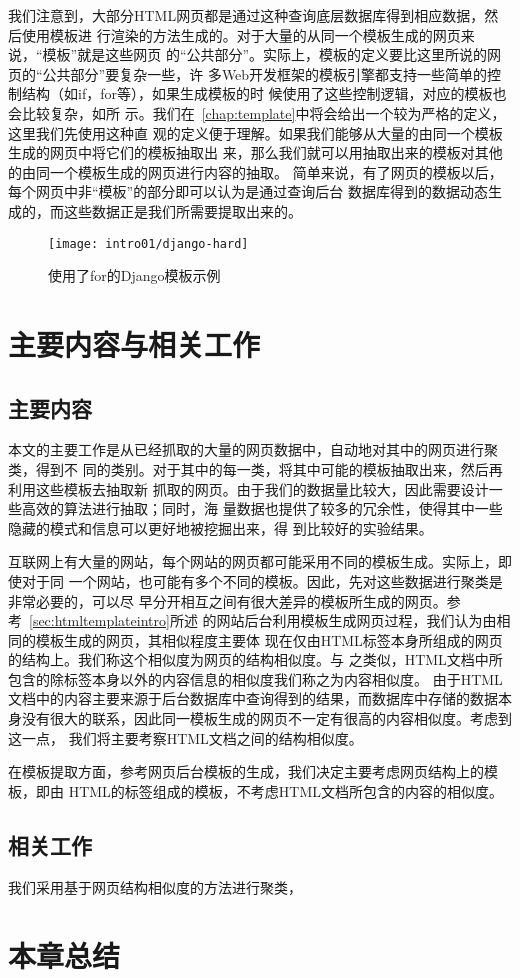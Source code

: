 我们注意到，大部分HTML网页都是通过这种查询底层数据库得到相应数据，然后使用模板进
行渲染的方法生成的。对于大量的从同一个模板生成的网页来说，“模板”就是这些网页
的“公共部分”。实际上，模板的定义要比这里所说的网页的“公共部分”要复杂一些，许
多Web开发框架的模板引擎都支持一些简单的控制结构（如if，for等），如果生成模板的时
候使用了这些控制逻辑，对应的模板也会比较复杂，如所
示。我们在~\ref{chap:template}中将会给出一个较为严格的定义，这里我们先使用这种直
观的定义便于理解。如果我们能够从大量的由同一个模板生成的网页中将它们的模板抽取出
来，那么我们就可以用抽取出来的模板对其他的由同一个模板生成的网页进行内容的抽取。
简单来说，有了网页的模板以后，每个网页中非“模板”的部分即可以认为是通过查询后台
数据库得到的数据动态生成的，而这些数据正是我们所需要提取出来的。
\begin{figure}
  \centering
  \texttt{[image: intro01/django-hard]}
  \caption{使用了for的Django模板示例}
  \label{intro:fig:django-hard}
\end{figure}
\section{主要内容与相关工作}
\subsection{主要内容}
\label{sec:mainwork}
本文的主要工作是从已经抓取的大量的网页数据中，自动地对其中的网页进行聚类，得到不
同的类别。对于其中的每一类，将其中可能的模板抽取出来，然后再利用这些模板去抽取新
抓取的网页。由于我们的数据量比较大，因此需要设计一些高效的算法进行抽取；同时，海
量数据也提供了较多的冗余性，使得其中一些隐藏的模式和信息可以更好地被挖掘出来，得
到比较好的实验结果。

互联网上有大量的网站，每个网站的网页都可能采用不同的模板生成。实际上，即使对于同
一个网站，也可能有多个不同的模板。因此，先对这些数据进行聚类是非常必要的，可以尽
早分开相互之间有很大差异的模板所生成的网页。参考~\ref{sec:htmltemplateintro}所述
的网站后台利用模板生成网页过程，我们认为由相同的模板生成的网页，其相似程度主要体
现在仅由HTML标签本身所组成的网页的结构上。我们称这个相似度为网页的结构相似度。与
之类似，HTML文档中所包含的除标签本身以外的内容信息的相似度我们称之为内容相似度。
由于HTML文档中的内容主要来源于后台数据库中查询得到的结果，而数据库中存储的数据本
身没有很大的联系，因此同一模板生成的网页不一定有很高的内容相似度。考虑到这一点，
我们将主要考察HTML文档之间的结构相似度。

在模板提取方面，参考网页后台模板的生成，我们决定主要考虑网页结构上的模板，即由
HTML的标签组成的模板，不考虑HTML文档所包含的内容的相似度。
\subsection{相关工作}
\label{sec:relatedwork}
我们采用基于网页结构相似度的方法进行聚类，
\section{本章总结}
\label{sec:summaryintro}



